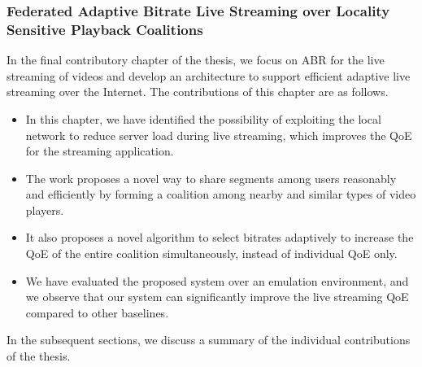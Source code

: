 \subsubsection{Federated Adaptive Bitrate Live Streaming over Locality Sensitive Playback Coalitions}
In the final contributory chapter of the thesis, we focus on ABR for the live streaming of videos and develop an architecture to support efficient adaptive live streaming over the Internet. The contributions of this chapter are as follows. 
\begin{itemize}
	\item In this chapter, we have identified the possibility of exploiting the local network to reduce server load during live streaming, which improves the QoE for the streaming application.
	\item The work proposes a novel way to share segments among users reasonably and efficiently by forming a coalition among nearby and similar types of video players.
	\item It also proposes a novel algorithm to select bitrates adaptively to increase the QoE of the entire coalition simultaneously, instead of individual QoE only.
	\item We have evaluated the proposed system over an emulation environment, and we observe that our system can significantly improve the live streaming QoE compared to other baselines. 
\end{itemize}

In the subsequent sections, we discuss a summary of the individual contributions of the thesis. 


